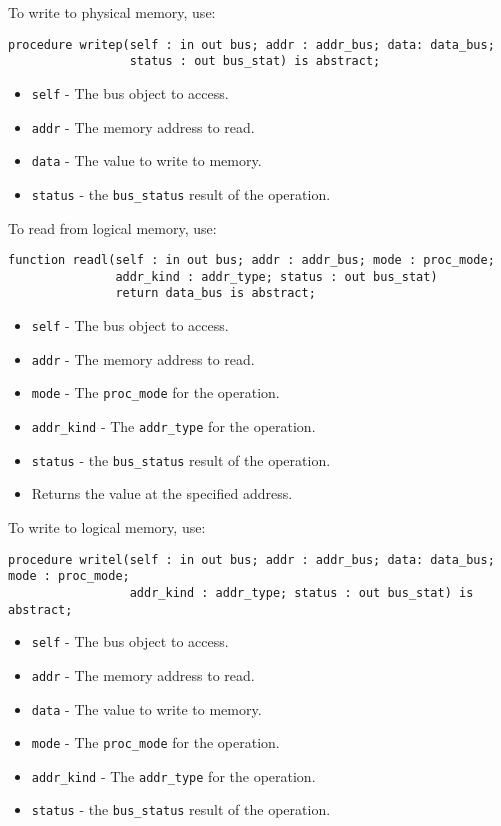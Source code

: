 \documentclass[10pt, openany]{book}
\newcommand{\keyword}[1]{\texttt{#1}}
\newcommand{\datatype}[1]{\texttt{#1}}
\begin{document}
To write to physical memory, use:
\begin{lstlisting}
procedure writep(self : in out bus; addr : addr_bus; data: data_bus;
                 status : out bus_stat) is abstract;
\end{lstlisting}
\begin{itemize}
  \item \keyword{self} - The bus object to access.
  \item \keyword{addr} - The memory address to read.
  \item \keyword{data} - The value to write to memory.
  \item \keyword{status} - the \datatype{bus\_status} result of the operation.
\end{itemize}

To read from logical memory, use:
\begin{lstlisting}
function readl(self : in out bus; addr : addr_bus; mode : proc_mode;
               addr_kind : addr_type; status : out bus_stat)
               return data_bus is abstract;
\end{lstlisting}
\begin{itemize}
  \item \keyword{self} - The bus object to access.
  \item \keyword{addr} - The memory address to read.
  \item \keyword{mode} - The \datatype{proc\_mode} for the operation.
  \item \keyword{addr\_kind} - The \datatype{addr\_type} for the operation.
  \item \keyword{status} - the \datatype{bus\_status} result of the operation.
  \item Returns the value at the specified address.
\end{itemize}

To write to logical memory, use:
\begin{lstlisting}
procedure writel(self : in out bus; addr : addr_bus; data: data_bus; mode : proc_mode;
                 addr_kind : addr_type; status : out bus_stat) is abstract;
\end{lstlisting}
\begin{itemize}
  \item \keyword{self} - The bus object to access.
  \item \keyword{addr} - The memory address to read.
  \item \keyword{data} - The value to write to memory.
  \item \keyword{mode} - The \datatype{proc\_mode} for the operation.
  \item \keyword{addr\_kind} - The \datatype{addr\_type} for the operation.
  \item \keyword{status} - the \datatype{bus\_status} result of the operation.
\end{itemize}
\end{document}
